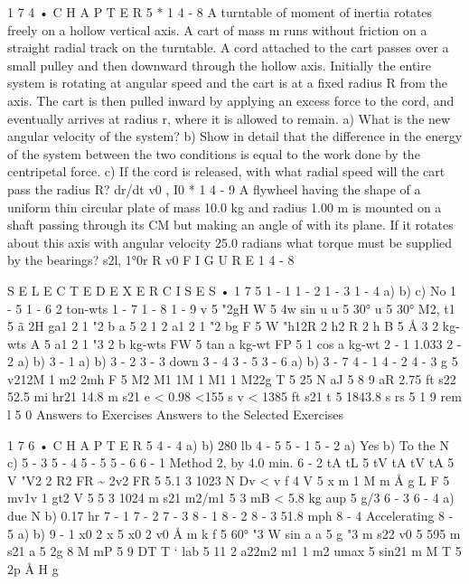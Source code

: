 \documentclass[10pt,oneside]{article}
\begin{document}
1 7 4 • C H A P T E R  5 \emph{ } * 1 4 - 8 A turntable of moment of inertia rotates freely on a hollow vertical axis. A cart of mass m runs without friction on a straight radial track on the turntable. A cord attached to the cart passes over a small pulley and then downward through the hollow axis. Initially the entire system is rotating at angular speed and the cart is at a fixed radius R from the axis. The cart is then pulled inward by applying an excess force to the cord, and eventually arrives at radius r, where it is allowed to remain. a) What is the new angular velocity of the system? b) Show in detail that the difference in the energy of the system between the two conditions is equal to the work done by the centripetal force. c) If the cord is released, with what radial speed will the cart pass the radius R? dr/dt v0 , I0 \emph{ } * 1 4 - 9 A flywheel having the shape of a uniform thin circular plate of mass 10.0 kg and radius 1.00 m is mounted on a shaft passing through its CM but making an angle of with its plane. If it rotates about this axis with angular velocity 25.0 radians what torque must be supplied by the bearings? s2l, 1°0r R v0 F I G U R E  1 4 - 8\par

S E L E C T E D  E X E R C I S E S • 1 7 5 1 - 1 1 - 2 1 - 3 1 - 4 a) b) c) No 1 - 5 1 - 6 2 ton-wts 1 - 7 1 - 8 1 - 9 v 5 "2gH W 5 4w sin u u 5 30° u 5 30° M2, t1 5 ã 2H ga1 2 1 "2 b a 5 2 1 2 a1 2 1 "2 bg F 5 W "h12R 2 h2 R 2 h B 5 Å 3 2 kg-wts A 5 a1 2 1 "3 2 b kg-wts FW 5 tan a kg-wt FP 5 1 cos a kg-wt 2 - 1 1.033 2 - 2 a) b) 3 - 1 a) b) 3 - 2 3 - 3 down 3 - 4 3 - 5 3 - 6 a) b) 3 - 7 4 - 1 4 - 2 4 - 3 g 5 v212M 1 m2 2mh F 5 M2 M1 1M 1 M1 1 M22g T 5 25 N aJ 5 8 9 aR 2.75 ft s22 52.5 mi hr21 14.8 m s21 e < 0.98 <155 s v < 1385 ft s21 t 5 1843.8 s rs 5 1 9 rem l 5 0 Answers to Exercises Answers to the Selected Exercises\par

1 7 6 • C H A P T E R  5 4 - 4 a) b) 280 lb 4 - 5 5 - 1 5 - 2 a) Yes b) To the N c) 5 - 3 5 - 4 5 - 5 5 - 6 6 - 1 Method 2, by 4.0 min. 6 - 2 tA tL 5 tV tA tV tA 5 V "V2 2 R2 FR \textasciitilde{} 2v2 FR 5 5.1 3 1023 N Dv < v f 4 V 5 x m 1 M m Å g L F 5 mv1v 1 gt2 V 5 5 3 1024 m s21 m2/m1 5 3 mB < 5.8 kg aup 5 g/3 6 - 3 6 - 4 a) due N b) 0.17 hr 7 - 1 7 - 2 7 - 3 8 - 1 8 - 2 8 - 3 51.8 mph 8 - 4 Accelerating 8 - 5 a) b) 9 - 1 x0 2 x 5 x0 2 v0 Å m k f 5 60° "3 W sin a a 5 g "3 m s22 v0 5 595 m s21 a 5 2g 8 M mP 5 9 DT T  ` lab 5 11 2 a22m2 m1 1 m2 umax 5 sin21 m M T 5 2p Å H g\par
\end{document}
